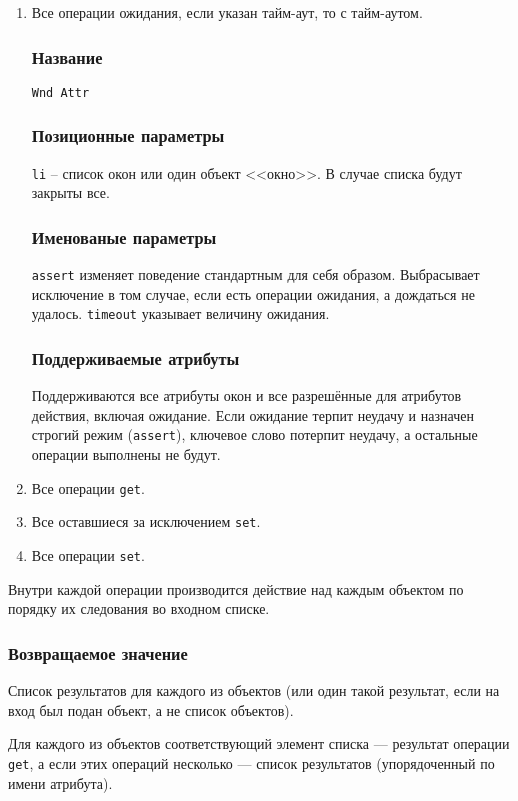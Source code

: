 \documentclass[11pt]{book} %
\begin{document}
\begin{enumerate}
\item Все операции ожидания, если указан тайм-аут, то с тайм-аутом.


\subsubsection*{Название} 
\verb"Wnd Attr"

\subsubsection*{Позиционные параметры} 
\verb"li" -- список окон или один объект <<окно>>. В случае списка будут закрыты все.

\subsubsection*{Именованые параметры} 
\verb"assert" изменяет поведение стандартным для себя образом. Выбрасывает исключение в том случае, если есть операции ожидания, а дождаться не удалось.
\verb"timeout" указывает величину ожидания.

\subsubsection*{Поддерживаемые атрибуты} 

Поддерживаются все атрибуты окон и все разрешённые для атрибутов действия, включая ожидание. Если ожидание терпит неудачу и назначен строгий режим (\verb|assert|), ключевое слово потерпит неудачу, а остальные операции выполнены не будут.
\item Все операции \verb|get|.
\item Все оставшиеся за исключением \verb|set|.
\item Все операции \verb|set|.
\end{enumerate}

Внутри каждой операции производится действие над каждым объектом по порядку их следования во входном списке.

\subsubsection*{Возвращаемое значение} 
Список результатов для каждого из объектов (или один такой результат, если на вход был подан объект, а не список объектов).

Для каждого из объектов соответствующий элемент списка --- результат операции \verb|get|, а если этих операций несколько --- список результатов (упорядоченный по имени атрибута).
\end{document}
